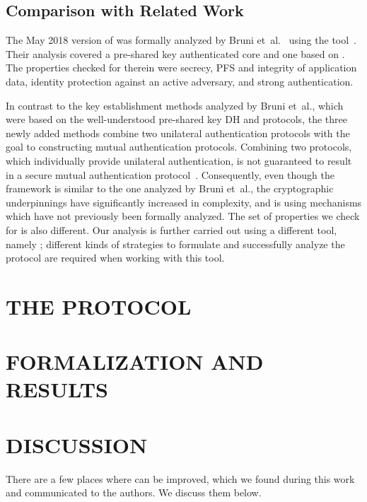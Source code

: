 \documentclass[a4paper,twoside,draft]{article}
\begin{document}
\subsection{Comparison with Related Work}
The May 2018 version of \mEdhoc{} was formally analyzed by
Bruni et~al.~\cite{DBLP:conf/secsr/BruniJPS18} using the \mProverif{}
tool~\cite{DBLP:conf/csfw/Blanchet01}.
%
Their analysis covered a pre-shared key authenticated core and one
based on \mSigma.
%
The properties checked for therein were secrecy, PFS and integrity of
application data, identity protection against an active adversary,
and strong authentication.
%

In contrast to the key establishment methods analyzed by Bruni et~al., which
were based on the well-understood pre-shared key DH and \mSigma{} protocols,
the three newly added
methods combine two unilateral authentication protocols with the goal to
constructing mutual authentication protocols.
%
Combining two protocols, which individually provide unilateral authentication,
is not guaranteed to result in a secure mutual authentication
protocol~\cite{DBLP:conf/ccs/Krawczyk16}.
%
Consequently, even though the framework is similar to the one analyzed by Bruni
et~al., the cryptographic underpinnings have significantly increased in
complexity, and is using mechanisms which have not previously been formally analyzed.
%
The set of properties we check for is also different.
%
Our analysis is further carried out using a different tool,
namely \mTamarin; different kinds of strategies to formulate and
successfully analyze the protocol are required when working with this tool.
%

\section{\uppercase{The \mEdhoc{} Protocol}}
\label{sec:edhoc}


\section{\uppercase{Formalization and Results}}
\label{sec:formalization}


\section{\uppercase{Discussion}}
\label{sec:discussion}
There are a few places where \mEdhoc{} can be improved,
which we found during this work and communicated to the authors.
%
We discuss them below.
%
\end{document}
